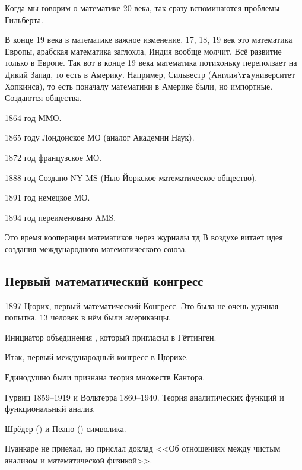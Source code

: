 \documentclass[a4paper,oneside,fleqn,10pt]{article}
\begin{document}
Когда мы говорим о математике 20 века, так сразу вспоминаются проблемы
Гильберта.

В конце 19 века в математике важное изменение. 17, 18, 19 век это
математика Европы, арабская математика заглохла, Индия вообще
молчит. Всё развитие только в Европе.  Так вот в конце 19 века
математика потихоньку переползает на Дикий Запад, то есть в Америку.
Например, Сильвестр (Англия$\ra$университет Хопкинса), то есть
поначалу математики в Америке были, но импортные. Создаются общества.

\begin{items}{-2}
\item 1864 год ММО.
\item 1865 году Лондонское МО (аналог Академии Наук).
\item 1872 год французское МО.
\item 1888 год Создано NY MS (Нью-Йоркское математическое общество).
\item 1891 год немецкое МО.
\item 1894 год переименовано AMS.
\end{items}

Это время кооперации математиков через журналы тд В воздухе витает
идея создания международного математического союза.

\subsection{Первый математический конгресс}

1897 Цюрих, первый математический Конгресс. Это была не очень удачная
попытка.  13 человек в нём были американцы.

Инициатор объединения , который
пригласил  в Гёттинген.

Итак, первый международный конгресс в Цюрихе.

\begin{items}{-2}
\item Единодушно были признана теория множеств Кантора.
\item Гурвиц 1859--1919 и Вольтерра 1860--1940. Теория аналитических
  функций и функциональный анализ.
\item Шрёдер () и Пеано () символика.
\item Пуанкаре не приехал, но прислал доклад <<Об отношениях между
  чистым анализом и математической физикой>>.
\end{items}
\end{document}
